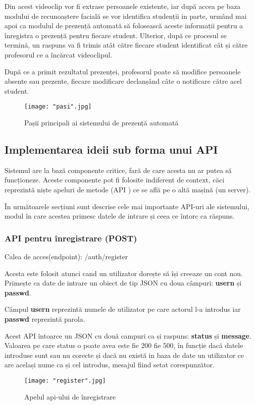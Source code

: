 \documentclass[a4paper, 12pt]{article}
\begin{document}
	Din acest videoclip vor fi extrase persoanele existente, iar după accea pe baza modului de recunoaștere facială se vor identifica studenții in parte, urmând mai apoi ca modulul de prezență automată să folosească aceste informații pentru a înregistra o prezență pentru fiecare student. Ulterior, după ce procesul se termină, un raspuns va fi trimis atât către fiecare student identificat cât și către profesorul ce a încărcat videoclipul.
	
	După ce a primit rezultatul prezenței, profesorul poate să modifice persoanele absente sau prezente, fiecare modificare declanșând câte o notificare către acel student.
	\bigskip
	\begin{figure}[!htb]
		\centering
		\texttt{[image: "pasi".jpg]}
		\caption{Pașii principali ai sistemului de prezență automată}\label{fig:steps}
	\end{figure}
	\subsection{Implementarea ideii sub forma unui API} 
	
	\quad\space Sistemul are la bază componente critice, fară de care acesta nu ar putea să funcționeze. Aceste componente pot fi folosite indiferent de context, căci reprezintă niște apeluri  de metode (API \textbf{\cite{strom2006methods}}) ce se află pe o altă mașină (un server).
	
	În următoarele secțiuni sunt descrise cele mai importante API-uri ale sistemului, modul în care acestea primesc datele de intrare și ceea ce întorc ca răspuns.
	\subsubsection{API pentru înregistrare (POST)} 
	
	\bigskip
	\quad\space\space Calea de acces(endpoint): /auth/register 
	
	Acesta este folosit atunci cand un utilizator dorește să își creeaze un cont nou. Primește ca date de intrare un obiect de tip JSON\textbf{\cite{bray2017javascript}} cu doua câmpuri: \textbf{usern} și \textbf{passwd}. 
	
	Câmpul \textbf{usern} reprezintă numele de utilizator pe care actorul l-a introdus iar \textbf{passwd} reprezintă parola.
	
	Acest API întoarce un JSON cu două campuri ca și raspuns: \textbf{status} și \textbf{message}. Valoarea pe care status o poate avea este fie 200 fie 500, în funcție dacă datele introduse sunt sau nu corecte și dacă nu există in baza de date un utilizator ce are același nume ca și cel introdus, mesajul fiind setat corespunzător.
	\begin{figure}[!htb]
		\centering
		\texttt{[image: "register".jpg]}
		\caption{Apelul api-ului de înregistrare}\label{fig:register}
	\end{figure}
	\bigskip
\end{document}
